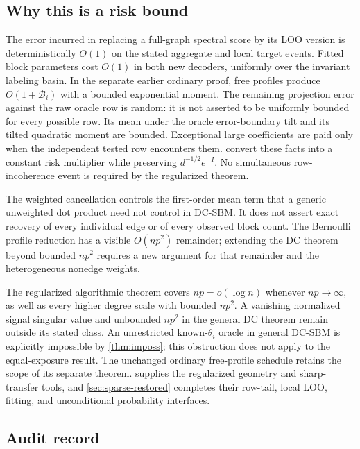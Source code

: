 \subsection{Why this is a risk bound}

The error incurred in replacing a full-graph spectral score by its LOO
version is deterministically $O(1)$ on the stated aggregate and local
target events. Fitted block parameters cost $O(1)$ in both new
decoders, uniformly over the invariant labeling basin.
In the separate earlier ordinary proof, free profiles produce
$O(1+\mathcal B_i)$ with a bounded exponential moment.
The remaining projection error against the raw oracle row is random:
it is not asserted to be uniformly bounded for every possible row.
Its mean under the oracle error-boundary tilt and its tilted quadratic
moment are bounded. Exceptional large coefficients are paid only when
the independent tested row encounters them.
convert these facts into a constant risk multiplier while preserving
$d^{-1/2}e^{-I}$. No simultaneous row-incoherence event is required
by the regularized theorem.

The weighted cancellation controls the first-order mean term that a
generic unweighted dot product need not control in DC-SBM. It does not
assert exact recovery of every individual edge or of every observed
block count. The Bernoulli profile reduction has a visible $O(np^2)$
remainder; extending the DC theorem beyond bounded $np^2$ requires a new
argument for that remainder and the heterogeneous nonedge weights.

The regularized algorithmic theorem covers $np=o(\log n)$ whenever
$np\to\infty$, as well as every higher degree scale with bounded
$np^2$. A vanishing normalized signal singular value and unbounded
$np^2$ in the general DC theorem remain outside its stated class.
An unrestricted known-$\theta_i$ oracle in general DC-SBM is
explicitly impossible by \cref{thm:imposs}; this obstruction does not
apply to the equal-exposure result. The unchanged ordinary
free-profile schedule retains the scope of its separate theorem.
 supplies the regularized geometry and
sharp-transfer tools, and \cref{sec:sparse-restored} completes their
row-tail, local LOO, fitting, and unconditional probability interfaces.

\subsection{Audit record}

